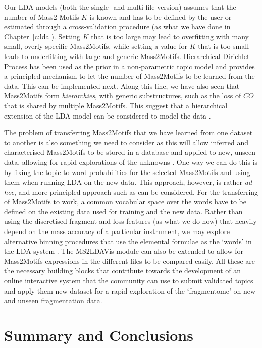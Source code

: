 Our LDA models (both the single- and multi-file version) assumes that the number of Mass2-Motifs $K$ is known and has to be defined by the user or estimated through a cross-validation procedure (as what we have done in Chapter~\ref{c:lda}). Setting $K$ that is too large may lead to overfitting with many small, overly specific Mass2Motifs, while setting a value for $K$ that is too small leads to underfitting with large and generic Mass2Motifs. Hierarchical Dirichlet Process has been used as the prior in a non-parametric topic model \cite{teh2012hierarchical} and provides a principled mechanism to let the number of Mass2Motifs to be learned from the data. This can be implemented next. Along this line, we have also seen that Mass2Motifs form \emph{hierarchies}, with generic substructures, such as the loss of $CO$ that is shared by multiple Mass2Motifs. This suggest that a hierarchical extension of the LDA model can be considered to model the data \cite{griffiths2004hierarchical}. 

The problem of transferring Mass2Motifs that we have learned from one dataset to another is also something we need to consider as this will allow inferred and characterised Mass2Motifs to be stored in a database and applied to new, unseen data, allowing for rapid explorations of the unknowns . One way we can do this is by fixing the topic-to-word probabilities for the selected Mass2Motifs and using them when running LDA on the new data. This approach, however, is rather \textit{ad-hoc}, and more principled approach such as \cite{kang2012transfer} can be considered. For the transferring of Mass2Motifs to work, a common vocabular space over the words have to be defined on the existing data used for training and the new data. Rather than using the discretised fragment and loss features (as what we do now) that heavily depend on the mass accuracy of a particular instrument, we may explore alternative binning procedures that use the elemental formulae as the `words' in the LDA system . The MS2LDAVis module can also be extended to allow for Mass2Motifs expressions in the different files to be compared easily. All these are the necessary building blocks that contribute towards the development of an online interactive system that the community can use to submit validated topics and apply them new dataset for a rapid exploration of the `fragmentome' on new and unseen fragmentation data.

\section{Summary and Conclusions}

